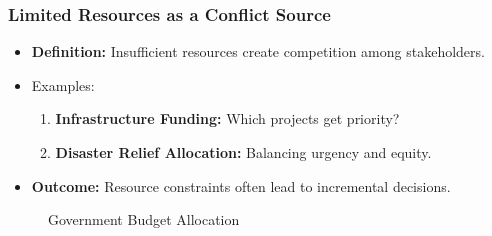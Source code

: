 \documentclass[10pt]{beamer}
\begin{document}
\begin{frame}
   \frametitle{Limited Resources as a Conflict Source}
   \begin{itemize}
       \item \textbf{Definition:} Insufficient resources create competition among stakeholders.
       \item Examples:
       \begin{enumerate}
           \item \textbf{Infrastructure Funding:} Which projects get priority?
           \item \textbf{Disaster Relief Allocation:} Balancing urgency and equity.
       \end{enumerate}
       \item \textbf{Outcome:} Resource constraints often lead to incremental decisions.
   \end{itemize}
   
   \vspace{0.3cm} %

   \begin{figure}
       \centering
       \caption{\scriptsize Government Budget Allocation} %
   \end{figure}
\end{frame}
\end{document}

